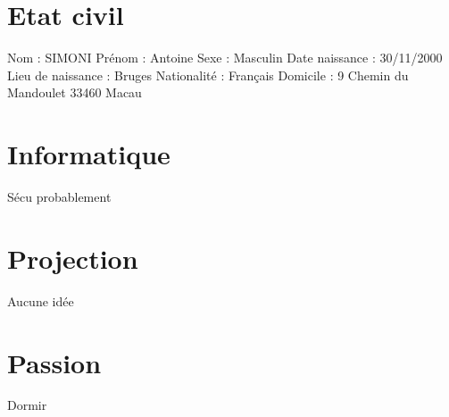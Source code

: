 \documentclass{article}
\begin{document}
\section{Etat civil}
Nom : SIMONI
\newline
Prénom : Antoine
\newline
Sexe : Masculin
\newline
Date naissance : 30/11/2000
\newline
Lieu de naissance : Bruges 
\newline
Nationalité : Français
\newline
Domicile : 9 Chemin du Mandoulet 33460 Macau


\section{Informatique}
Sécu probablement

\section{Projection}
Aucune idée

\section{Passion}
Dormir
\end{document}

